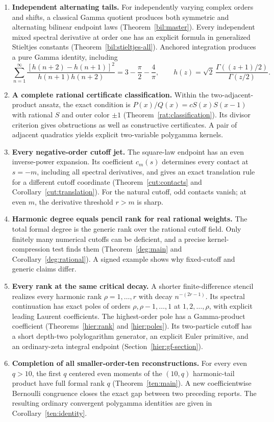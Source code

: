 \documentclass[11pt]{article}
\theoremstyle{definition}
\theoremstyle{remark}
\numberwithin{equation}{section}
\begin{document}
\begin{enumerate}[leftmargin=*]
\item \textbf{Independent alternating tails.}
For independently varying complex orders and shifts, a classical Gamma
quotient produces both symmetric and alternating bilinear endpoint
laws (Theorem~\ref{bil:master}). Every independent mixed spectral
derivative at order one has an explicit formula in generalized
Stieltjes constants (Theorem~\ref{bil:stieltjes-all}). Anchored
integration produces a pure Gamma identity, including
\[
 \sum_{n=1}^{\infty}
 \frac{[h(n+2)-h(n+1)]^2}{h(n+1)h(n+2)}
       =3-\frac\pi2-\frac4\pi,
 \qquad h(z)=\sqrt2\,\frac{\Gamma((z+1)/2)}{\Gamma(z/2)}.
\]
\item \textbf{A complete rational certificate classification.}
Within the two-adjacent-product ansatz, the exact condition is
$P(x)/Q(x)=cS(x)S(x-1)$ with rational $S$ and outer color $\pm1$
(Theorem~\ref{rat:classification}). Its divisor criterion gives
obstructions as well as constructive certificates. A pair of adjacent
quadratics yields explicit two-variable polygamma kernels.
\item \textbf{Every negative-order cutoff jet.}
The square-law endpoint has an even inverse-power expansion. Its
coefficient $c_m(s)$ determines every contact at $s=-m$, including
all spectral derivatives, and gives an exact translation rule for a
different cutoff coordinate (Theorem~\ref{cut:contacts} and
Corollary~\ref{cut:translation}). For the natural cutoff, odd contacts
vanish; at even $m$, the derivative threshold $r>m$ is sharp.
\item \textbf{Harmonic degree equals pencil rank for real rational weights.}
The total formal degree is the generic rank over the rational cutoff
field. Only finitely many numerical cutoffs can be deficient, and a
precise kernel-compression test finds them
(Theorem~\ref{deg:main} and Corollary~\ref{deg:rational}). A signed
example shows why fixed-cutoff and generic claims differ.
\item \textbf{Every rank at the same critical decay.}
A shorter finite-difference stencil realizes every harmonic rank
$\rho=1,\ldots,r$ with decay $n^{-(2r-1)}$. Its spectral continuation
has exact poles of orders $\rho,\rho-1,\ldots,1$ at $1,2,\ldots,\rho$,
with explicit leading Laurent coefficients. The highest-order pole
has a Gamma-product coefficient
(Theorems~\ref{hier:rank} and \ref{hier:poles}). Its two-particle
cutoff has a short depth-two polylogarithm generator, an explicit
Euler primitive, and an ordinary-zeta integral endpoint
(Section~\ref{hier:gf-section}).
\item \textbf{Completion of all smaller-order-ten reconstructions.}
For every even $q>10$, the first $q$ centered even moments of the
$(10,q)$ harmonic-tail product have full formal rank $q$
(Theorem~\ref{ten:main}). A new coefficientwise Bernoulli congruence
closes the exact gap between two preceding reports. The resulting
ordinary convergent polygamma identities are given in
Corollary~\ref{ten:identity}.
\end{enumerate}
\end{document}

